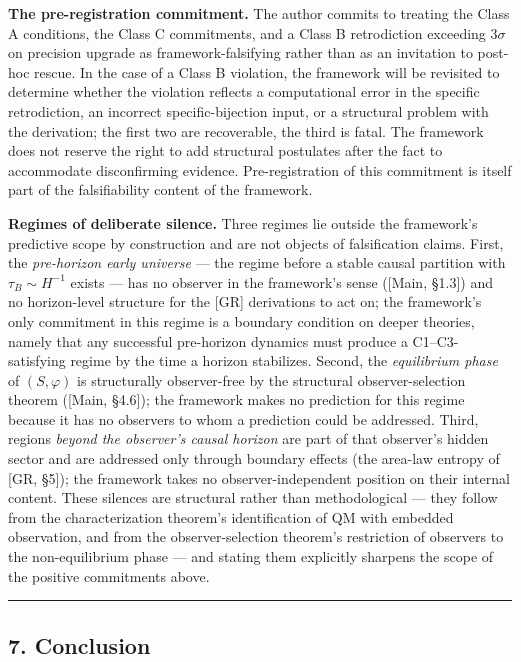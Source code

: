 \documentclass[
]{article}
\begin{document}
\textbf{The pre-registration commitment.} The author commits to treating
the Class A conditions, the Class C commitments, and a Class B
retrodiction exceeding \(3\sigma\) on precision upgrade as
framework-falsifying rather than as an invitation to post-hoc rescue. In
the case of a Class B violation, the framework will be revisited to
determine whether the violation reflects a computational error in the
specific retrodiction, an incorrect specific-bijection input, or a
structural problem with the derivation; the first two are recoverable,
the third is fatal. The framework does not reserve the right to add
structural postulates after the fact to accommodate disconfirming
evidence. Pre-registration of this commitment is itself part of the
falsifiability content of the framework.

\textbf{Regimes of deliberate silence.} Three regimes lie outside the
framework's predictive scope by construction and are not objects of
falsification claims. First, the \emph{pre-horizon early universe} ---
the regime before a stable causal partition with \(\tau_B \sim H^{-1}\)
exists --- has no observer in the framework's sense ({[}Main, §1.3{]})
and no horizon-level structure for the {[}GR{]} derivations to act on;
the framework's only commitment in this regime is a boundary condition
on deeper theories, namely that any successful pre-horizon dynamics must
produce a C1--C3-satisfying regime by the time a horizon stabilizes.
Second, the \emph{equilibrium phase} of \((S, \varphi)\) is structurally
observer-free by the structural observer-selection theorem ({[}Main,
§4.6{]}); the framework makes no prediction for this regime because it
has no observers to whom a prediction could be addressed. Third, regions
\emph{beyond the observer's causal horizon} are part of that observer's
hidden sector and are addressed only through boundary effects (the
area-law entropy of {[}GR, §5{]}); the framework takes no
observer-independent position on their internal content. These silences
are structural rather than methodological --- they follow from the
characterization theorem's identification of QM with embedded
observation, and from the observer-selection theorem's restriction of
observers to the non-equilibrium phase --- and stating them explicitly
sharpens the scope of the positive commitments above.

\begin{center}\rule{0.5\linewidth}{0.5pt}\end{center}

\hypertarget{conclusion}{%
\subsection{7. Conclusion}\label{conclusion}}
\end{document}
